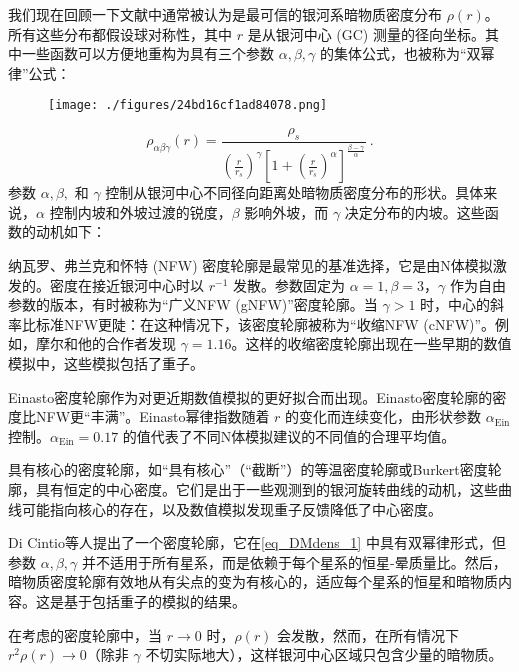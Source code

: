 
 
我们现在回顾一下文献中通常被认为是最可信的银河系暗物质密度分布 \(\rho(r)\)。所有这些分布都假设球对称性，其中 \(r\) 是从银河中心 (GC) 测量的径向坐标。其中一些函数可以方便地重构为具有三个参数 \(\alpha, \beta, \gamma\) 的集体公式，也被称为“双幂律”公式：

\begin{figure}[ht]
\centering
\texttt{[image: ./figures/24bd16cf1ad84078.png]}
\caption{} \label{fig_DMdens_1}
\end{figure}
\begin{equation}\label{eq_DMdens_1}
\rho_{\alpha\beta\gamma}(r) =  \frac{\rho_s}{ \left(\frac{r}{r_s}\right)^\gamma \left[1 + \left(\frac{r}{r_s}\right)^\alpha\right]^{\frac{\beta-\gamma}{\alpha}}  } ~.
\end{equation}
参数 \(\alpha, \beta,\) 和 \(\gamma\) 控制从银河中心不同径向距离处暗物质密度分布的形状。具体来说，\(\alpha\) 控制内坡和外坡过渡的锐度，\(\beta\) 影响外坡，而 \(\gamma\) 决定分布的内坡。这些函数的动机如下：

纳瓦罗、弗兰克和怀特 (NFW) 密度轮廓是最常见的基准选择，它是由N体模拟激发的。密度在接近银河中心时以 \(r^{-1}\) 发散。参数固定为 \(\alpha = 1, \beta = 3\)，\(\gamma\) 作为自由参数的版本，有时被称为“广义NFW (gNFW)”密度轮廓。当 \(\gamma > 1\) 时，中心的斜率比标准NFW更陡：在这种情况下，该密度轮廓被称为“收缩NFW (cNFW)”。例如，摩尔和他的合作者发现 \(\gamma = 1.16\)。这样的收缩密度轮廓出现在一些早期的数值模拟中，这些模拟包括了重子。

Einasto密度轮廓作为对更近期数值模拟的更好拟合而出现。Einasto密度轮廓的密度比NFW更“丰满”。Einasto幂律指数随着 \(r\) 的变化而连续变化，由形状参数 \(\alpha_{\text{Ein}}\) 控制。\(\alpha_{\text{Ein}} = 0.17\) 的值代表了不同N体模拟建议的不同值的合理平均值。

具有核心的密度轮廓，如“具有核心”（“截断”）的等温密度轮廓或Burkert密度轮廓，具有恒定的中心密度。它们是出于一些观测到的银河旋转曲线的动机，这些曲线可能指向核心的存在，以及数值模拟发现重子反馈降低了中心密度。

Di Cintio等人提出了一个密度轮廓，它在\autoref{eq_DMdens_1} 中具有双幂律形式，但参数 \(\alpha, \beta, \gamma\) 并不适用于所有星系，而是依赖于每个星系的恒星-晕质量比。然后，暗物质密度轮廓有效地从有尖点的变为有核心的，适应每个星系的恒星和暗物质内容。这是基于包括重子的模拟的结果。

在考虑的密度轮廓中，当 \(r \to 0\) 时，\(\rho(r)\) 会发散，然而，在所有情况下 \(r^2\rho(r) \to 0\)（除非 \(\gamma\) 不切实际地大），这样银河中心区域只包含少量的暗物质。

